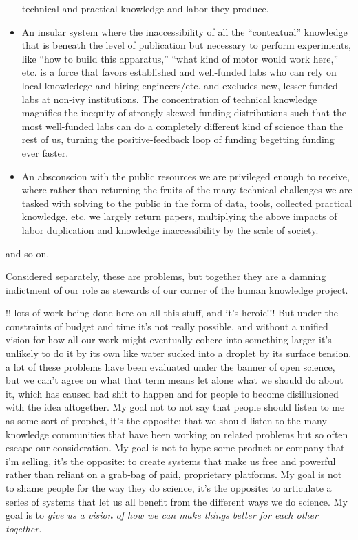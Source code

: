 \documentclass{article}
\begin{document}
\begin{itemize}
  technical and practical knowledge and labor they produce.
\item
  An insular system where the inaccessibility of all the ``contextual''
  knowledge \cite{woolKnowledgeNetworksHow2020a,
  barleyBackroomsScienceWork1994} that is beneath the level of
  publication but necessary to perform experiments, like ``how to build
  this apparatus,'' ``what kind of motor would work here,'' etc. is a
  force that favors established and well-funded labs who can rely on
  local knowledege and hiring engineers/etc. and excludes new,
  lesser-funded labs at non-ivy institutions. The concentration of
  technical knowledge magnifies the inequity of strongly skewed funding
  distributions such that the most well-funded labs can do a completely
  different kind of science than the rest of us, turning the
  positive-feedback loop of funding begetting funding ever faster.
\item
  An absconscion with the public resources we are privileged enough to
  receive, where rather than returning the fruits of the many technical
  challenges we are tasked with solving to the public in the form of
  data, tools, collected practical knowledge, etc. we largely return
  papers, multiplying the above impacts of labor duplication and
  knowledge inaccessibility by the scale of society.
\end{itemize}

and so on.

Considered separately, these are problems, but together they are a
damning indictment of our role as stewards of our corner of the human
knowledge project.

!! lots of work being done here on all this stuff, and it's heroic!!!
But under the constraints of budget and time it's not really possible,
and without a unified vision for how all our work might eventually
cohere into something larger it's unlikely to do it by its own like
water sucked into a droplet by its surface tension. a lot of these
problems have been evaluated under the banner of open science, but we
can't agree on what that term means let alone what we should do about
it, which has caused bad shit to happen and for people to become
disillusioned with the idea altogether. My goal not to not say that
people should listen to me as some sort of prophet, it's the opposite:
that we should listen to the many knowledge communities that have been
working on related problems but so often escape our consideration. My
goal is not to hype some product or company that i'm selling, it's the
opposite: to create systems that make us free and powerful rather than
reliant on a grab-bag of paid, proprietary platforms. My goal is not to
shame people for the way they do science, it's the opposite: to
articulate a series of systems that let us all benefit from the
different ways we do science. My goal is to \emph{give us a vision of
how we can make things better for each other together.}
\end{document}
